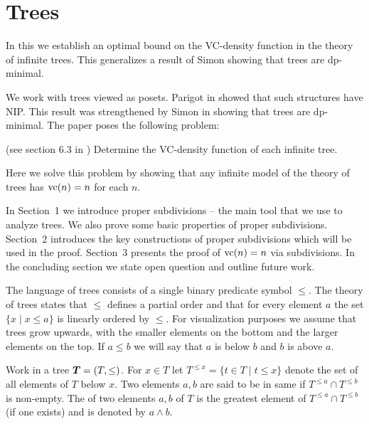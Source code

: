 \chapter{Trees}
In this \chapa we establish an optimal bound on the VC-density function in the theory of infinite trees.
This generalizes a result of Simon showing that trees are dp-minimal. 
 
We work with trees viewed as posets.
Parigot in \cite{parigot_trees} showed that such structures have NIP.
This result was strengthened by Simon in \cite{simon_dp_min} showing that trees are dp-minimal.
The paper \cite{density} poses the following problem:

\begin{Problem} (see section 6.3 in \cite{density})
  Determine the VC-density function of each infinite tree.
\end{Problem}

Here we solve this problem by showing that any infinite model of the theory of trees has $\operatorname{vc}(n) = n$ for each $n$.

In Sec\-tion~1 we introduce proper subdivisions -- the main tool that we use to analyze trees.
We also prove some basic properties of proper subdivisions.
Sec\-tion~2 introduces the key constructions of proper subdivisions which will be used in the proof.
Sec\-tion~3 presents the proof of $\operatorname{vc}(n) = n$ via subdivisions.
In the concluding section we state open question and outline future work.

The language of trees consists of a single binary predicate symbol $\leq$. The theory of trees states that $\leq$ defines a partial order and that for every element $a$ the set $\{x \mid x \leq a\}$ is linearly ordered by $\leq$. For visualization purposes we assume that trees grow upwards, with the smaller elements on the bottom and the larger elements on the top. If $a \leq b$ we will say that $a$ is below $b$ and $b$ is above $a$.

\begin{Definition}
  Work in a tree $\operatorname{\boldsymbol T} = (T, \leq)$.
  For $x \in T$ let $T^{\leq x} = \{t \in T \mid t \leq x\}$ denote the set of all elements of $T$ below $x$.
  Two elements $a,b$ are said to be in same  if $T^{\leq a} \cap T^{\leq b}$ is non-empty.
  The  of two elements $a,b$ of $T$ is the greatest element of $T^{\leq a} \cap T^{\leq b}$ (if one exists) and is denoted by $a \wedge b$.
\end{Definition}

